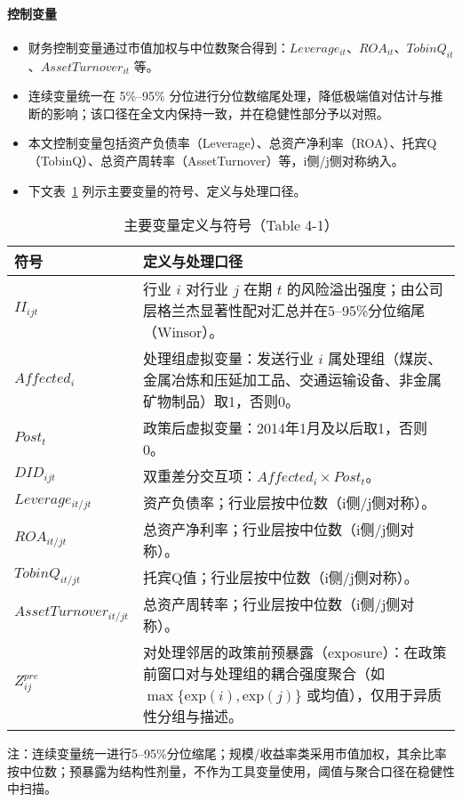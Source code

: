 \paragraph{控制变量}
\begin{itemize}
    \item 财务控制变量通过市值加权与中位数聚合得到：$Leverage_{it}$、$ROA_{it}$、$TobinQ_{it}$、$AssetTurnover_{it}$ 等。
    \item 连续变量统一在 5\%--95\% 分位进行分位数缩尾处理，降低极端值对估计与推断的影响；该口径在全文内保持一致，并在稳健性部分予以对照。
    \item 本文控制变量包括资产负债率（Leverage）、总资产净利率（ROA）、托宾Q（TobinQ）、总资产周转率（AssetTurnover）等，i侧/j侧对称纳入。
    \item 下文表~\ref{tab:variables_4_1} 列示主要变量的符号、定义与处理口径。
\end{itemize}

\begin{table}[htbp]
\centering
\caption{主要变量定义与符号（Table 4-1）}
\label{tab:variables_4_1}
\begin{threeparttable}
\small
\begin{tabular}{lp{10.5cm}}
\toprule
\textbf{符号} & \textbf{定义与处理口径} \\
\midrule
$II_{ijt}$ & 行业 $i$ 对行业 $j$ 在期 $t$ 的风险溢出强度；由公司层格兰杰显著性配对汇总并在5--95\%分位缩尾（Winsor）。\\
$Affected_i$ & 处理组虚拟变量：发送行业 $i$ 属处理组（煤炭、金属冶炼和压延加工品、交通运输设备、非金属矿物制品）取1，否则0。\\
$Post_t$ & 政策后虚拟变量：2014年1月及以后取1，否则0。\\
$DID_{ijt}$ & 双重差分交互项：$Affected_i\times Post_t$。\\
$Leverage_{it/jt}$ & 资产负债率；行业层按中位数（i侧/j侧对称）。\\
$ROA_{it/jt}$ & 总资产净利率；行业层按中位数（i侧/j侧对称）。\\
$TobinQ_{it/jt}$ & 托宾Q值；行业层按中位数（i侧/j侧对称）。\\
$AssetTurnover_{it/jt}$ & 总资产周转率；行业层按中位数（i侧/j侧对称）。\\
$Z^{pre}_{ij}$ & 对处理邻居的政策前预暴露（exposure）：在政策前窗口对与处理组的耦合强度聚合（如 $\max\{\text{exp}(i),\text{exp}(j)\}$ 或均值），仅用于异质性分组与描述。\\
\bottomrule
\end{tabular}
\begin{tablenotes}
\footnotesize
\item 注：连续变量统一进行5--95\%分位缩尾；规模/收益率类采用市值加权，其余比率按中位数；预暴露为结构性剂量，不作为工具变量使用，阈值与聚合口径在稳健性中扫描。
\end{tablenotes}
\end{threeparttable}
\end{table}

